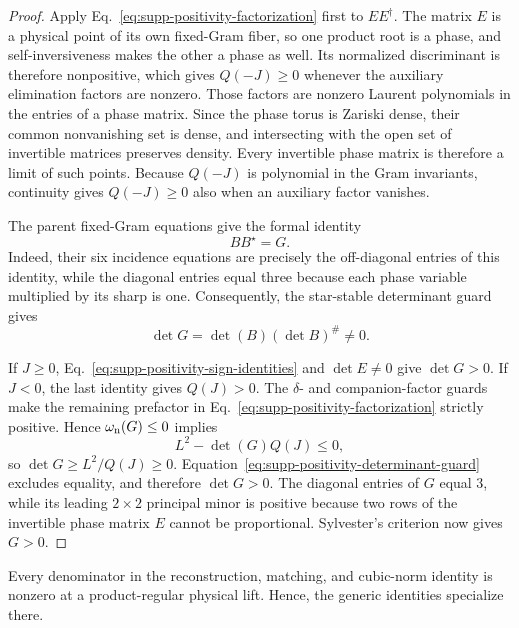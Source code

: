 \begin{proof}
Apply Eq.~\eqref{eq:supp-positivity-factorization} first to $EE^\dagger$.  The matrix $E$ is a physical point of its own fixed-Gram fiber, so one product root is a phase, and self-inversiveness makes the other a phase as well. Its normalized discriminant is therefore nonpositive, which gives $Q(-J)\geq0$ whenever the auxiliary elimination factors are nonzero. Those factors are nonzero Laurent polynomials in the entries of a phase matrix. Since the phase torus is Zariski dense, their common nonvanishing set is dense, and intersecting with the open set of invertible matrices preserves density. Every invertible phase matrix is therefore a limit of such points. Because $Q(-J)$ is polynomial in the Gram invariants, continuity gives $Q(-J)\geq0$ also when an auxiliary factor vanishes.

The parent fixed-Gram equations give the formal identity
\begin{equation}
BB^\star=G.
\label{eq:supp-positivity-formal-gram}
\end{equation}
Indeed, their six incidence equations are precisely the off-diagonal entries of this identity, while the diagonal entries equal three because each phase variable multiplied by its sharp is one. Consequently, the star-stable determinant guard gives
\begin{equation}
\det G=\det(B)(\det B)^\#\ne0.
\label{eq:supp-positivity-determinant-guard}
\end{equation}

If $J\geq0$, Eq.~\eqref{eq:supp-positivity-sign-identities} and $\det E\ne0$ give $\det G>0$. If $J<0$, the last identity gives $Q(J)>0$. The $\delta$- and companion-factor guards make the remaining prefactor in Eq.~\eqref{eq:supp-positivity-factorization} strictly positive. Hence $\omega_{\rm n}(G)\leq0$ implies
\begin{equation}
L^2-\det(G)Q(J)\leq0,
\end{equation}
so $\det G\geq L^2/Q(J)\geq0$. Equation~\eqref{eq:supp-positivity-determinant-guard} excludes equality, and therefore $\det G>0$. The diagonal entries of $G$ equal $3$, while its leading $2\times2$ principal minor is positive because two rows of the invertible phase matrix $E$ cannot be proportional.  Sylvester's criterion now gives $G>0$.
\end{proof}


\begin{lemma}
\label{lem:supp-regular-localization}
{Every denominator in the reconstruction, matching, and cubic-norm identity is nonzero at a product-regular physical lift. Hence, the generic identities specialize there.}
\end{lemma}

